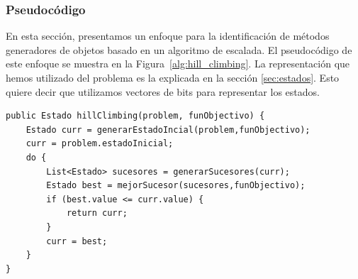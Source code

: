 



\subsubsection{Pseudocódigo}

En esta sección, presentamos un enfoque para la identificación de métodos generadores de objetos basado en un algoritmo de escalada. El pseudocódigo de este enfoque se muestra en la Figura~\ref{alg:hill_climbing}.
La representación que hemos utilizado del problema es la explicada en la sección \ref{sec:estados}. Esto quiere decir que utilizamos vectores de bits para representar los estados. 


\begin{lstlisting}[style=javaStyle, caption={Algoritmo de Hill Climbing}, label={alg:hill_climbing}]
public Estado hillClimbing(problem, funObjectivo) {
    Estado curr = generarEstadoIncial(problem,funObjectivo);
    curr = problem.estadoInicial;
    do {
        List<Estado> sucesores = generarSucesores(curr);
        Estado best = mejorSucesor(sucesores,funObjectivo);
        if (best.value <= curr.value) {
            return curr;
        }
        curr = best;
    }
}
\end{lstlisting}

